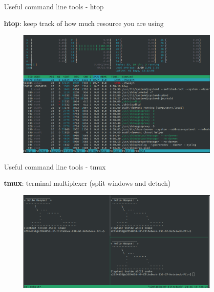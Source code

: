 \documentclass[10pt]{beamer}
\begin{document}
\begin{frame}[fragile]{Useful command line tools - htop}

\textbf{htop\footnotemark}: keep track of how much resource you are using

\begin{figure}[!ht]
\centering
\includegraphics[width = 0.9\textwidth]{images/htop.png}
\end{figure}


\end{frame}

\begin{frame}[fragile]{Useful command line tools - tmux}

\textbf{tmux\footnotemark}: terminal multiplexer (split windows and detach)

\begin{figure}[!ht]
\centering
\includegraphics[width = 0.9\textwidth]{images/tmux.png}
\end{figure}


\end{frame}
\end{document}
